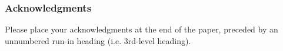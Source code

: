 \documentclass[runningheads]{llncs}
\begin{document}

\subsubsection{Acknowledgments} Please place your acknowledgments at
the end of the paper, preceded by an unnumbered run-in heading (i.e.
3rd-level heading).



\end{document}
